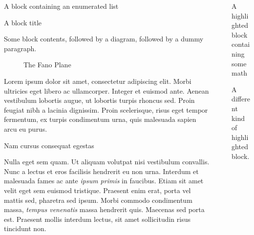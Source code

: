 \documentclass[final]{beamer}
\newlength{\sepwidth}
\newlength{\colwidth}
\newcommand{\separatorcolumn}{\begin{column}{\sepwidth}\end{column}}
\begin{document}
\begin{frame}[t]
\begin{columns}[t]
\begin{column}{\colwidth}
\begin{block}{A block containing an enumerated list}
  \end{block}

    \begin{block}{A block title}

    Some block contents, followed by a diagram, followed by a dummy paragraph.

    \begin{figure}
      \centering
      \caption{The Fano Plane}
    \end{figure}

    Lorem ipsum dolor sit amet, consectetur adipiscing elit. Morbi ultricies
    eget libero ac ullamcorper. Integer et euismod ante. Aenean vestibulum
    lobortis augue, ut lobortis turpis rhoncus sed. Proin feugiat nibh a
    lacinia dignissim. Proin scelerisque, risus eget tempor fermentum, ex
    turpis condimentum urna, quis malesuada sapien arcu eu purus.

  \end{block}

  \begin{block}{Nam cursus consequat egestas}

    Nulla eget sem quam. Ut aliquam volutpat nisi vestibulum convallis. Nunc a
    lectus et eros facilisis hendrerit eu non urna. Interdum et malesuada fames
    ac ante \textit{ipsum primis} in faucibus. Etiam sit amet velit eget sem
    euismod tristique. Praesent enim erat, porta vel mattis sed, pharetra sed
    ipsum. Morbi commodo condimentum massa, \textit{tempus venenatis} massa
    hendrerit quis. Maecenas sed porta est. Praesent mollis interdum lectus,
    sit amet sollicitudin risus tincidunt non.

  \end{block}

\end{column}

\separatorcolumn

\begin{column}{\colwidth}

  \begin{exampleblock}{A highlighted block containing some math}

    A different kind of highlighted block.


\end{exampleblock}
\end{column}
\end{columns}
\end{frame}
\end{document}
